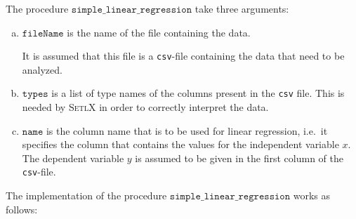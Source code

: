 \noindent
The procedure $\mathtt{simple\_linear\_regression}$ take three arguments:
\begin{enumerate}[(a)]
\item $\mathtt{fileName}$ is the name of the file containing the data.

      It is assumed that this file is a \texttt{csv}-file containing the data that need to be analyzed.
\item $\mathtt{types}$ is a list of type names of the columns present in the \texttt{csv} file.  This is needed
      by \textsc{SetlX} in order to correctly interpret the data.

\item $\mathtt{name}$ is the column name that is to be used for linear regression, i.e.~it specifies the column that 
      contains the values for the independent variable $x$.  The dependent variable $y$ is assumed to be given in
      the first column of the \texttt{csv}-file.
\end{enumerate}
The implementation of the procedure $\mathtt{simple\_linear\_regression}$ works as follows:
